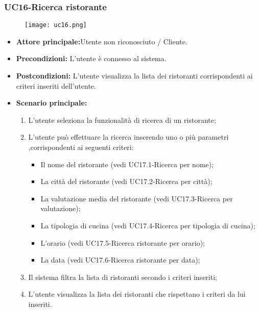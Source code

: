 \subsubsection{UC16-Ricerca ristorante}
\begin{figure}[h] \texttt{[image: uc16.png]} \end{figure}
\begin{itemize}
\item \textbf{Attore principale:}Utente non riconosciuto / Cliente.
\item \textbf{Precondizioni:} L'utente è connesso al sistema.
\item \textbf{Postcondizioni:} L'utente visualizza la lista dei ristoranti corrispondenti ai criteri inseriti
dell'utente.
\item \textbf{Scenario principale:}
\begin{enumerate}
    \item L'utente seleziona la funzionalità di ricerca di un ristorante;
    \item L'utente può effettuare la ricerca inserendo uno o più parametri ,corrispondenti
    ai seguenti criteri:
    \begin{itemize}
        \item Il nome del ristorante (vedi UC17.1-Ricerca per nome);
        \item La città del ristorante (vedi UC17.2-Ricerca per città);
        \item La valutazione media del ristorante (vedi UC17.3-Ricerca per valutazione);
        \item La tipologia di cucina (vedi UC17.4-Ricerca per tipologia di cucina);
        \item L'orario (vedi UC17.5-Ricerca ristorante per orario);
        \item La data (vedi UC17.6-Ricerca ristorante per data);
    \end{itemize}
    \item Il sistema filtra la lista di ristoranti secondo i criteri inseriti;
    \item L'utente visualizza la lista dei ristoranti che rispettano i criteri da lui inseriti.
\end{enumerate}
\end{itemize}

